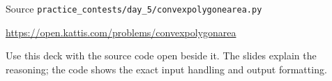 \documentclass[aspectratio=169,11pt]{beamer}
\begin{document}
\begin{frame}{Source}
\small
{} \texttt{practice\_contests/day\_5/convexpolygonearea.py}

\vspace{0.3cm}
 \url{https://open.kattis.com/problems/convexpolygonarea}

\vspace{0.45cm}
Use this deck with the source code open beside it. The slides explain the reasoning; the code shows the exact input handling and output formatting.
\end{frame}
\end{document}
